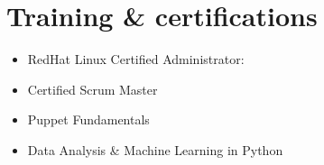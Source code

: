 \documentclass[]{cv-style}          %
\begin{document}
\section{Training \& certifications}
  \vspace{-0.2cm}
\begin{itemize}
\item{RedHat Linux Certified Administrator:}\\
\item{Certified Scrum Master}\\
\item{Puppet Fundamentals}\\
\item{Data Analysis \& Machine Learning in Python}\\
\end{itemize}


\end{document}

